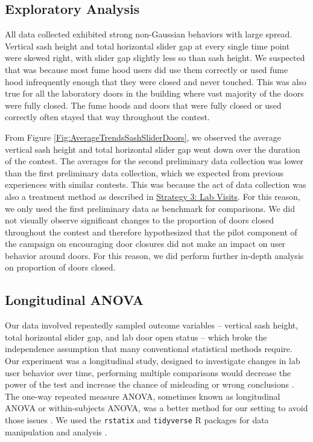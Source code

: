 \documentclass[12pt, twocolumn]{article}
\begin{document}
\subsection*{Exploratory Analysis}\label{Sec:ExploratoryAnalysis}
All data collected exhibited strong non-Gaussian behaviors with large spread. Vertical sash height and total horizontal slider gap at every single time point were skewed right, with slider gap slightly less so than sash height. We suspected that was because most fume hood users did use them correctly or used fume hood infrequently enough that they were closed and never touched. This was also true for all the laboratory doors in the building where vast majority of the doors were fully closed. The fume hoods and doors that were fully closed or used correctly often stayed that way throughout the contest. 

From Figure \ref{Fig:AverageTrendsSashSliderDoors}, we observed the average vertical sash height and total horizontal slider gap went down over the duration of the contest. The averages for the second preliminary data collection was lower than the first preliminary data collection, which we expected from previous experiences with similar contests. This was because the act of data collection was also a treatment method as described in  \hyperref[Sec:Strategy3]{Strategy 3: Lab Visits}. For this reason, we only used the first preliminary data as benchmark for comparisons. We did not visually observe significant changes to the proportion of doors closed throughout the contest and therefore hypothesized that the pilot component of the campaign on encouraging door closures did not make an impact on user behavior around doors. For this reason, we did perform further in-depth analysis on proportion of doors closed. 

\subsection*{Longitudinal ANOVA}
Our data involved repeatedly sampled outcome variables -- vertical sash height, total horizontal slider gap, and lab door open status -- which broke the independence assumption that many conventional statistical methods require. Our experiment was a longitudinal study, designed to investigate changes in lab user behavior over time, performing multiple comparisons would decrease the power of the test and increase the chance of misleading or wrong conclusions \cite{SchoberPatrick2018RMDa}. The one-way repeated measure ANOVA, sometimes known as longitudinal ANOVA or within-subjects ANOVA, was a better method for our setting to avoid those issues \cite{StatMethodPsychology} \cite{RComparingGroups}.  We used the \texttt{rstatix} and \texttt{tidyverse} R packages for data manipulation and analysis \cite{rstatix} \cite{tidyverse}. 
\end{document}
